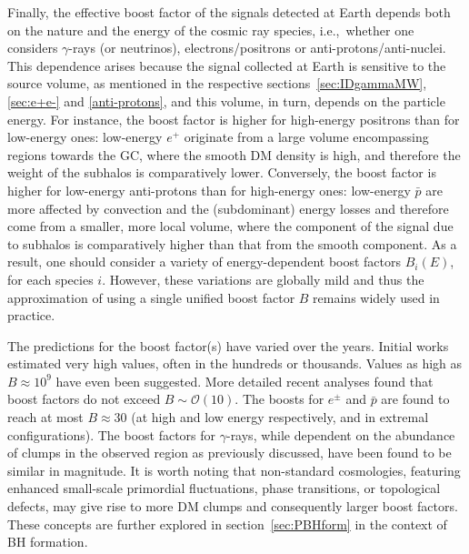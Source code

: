 \smallskip

Finally, the effective boost factor of the signals detected at Earth depends both on the nature and the energy of the cosmic ray species, i.e.,~whether one considers $\gamma$-rays (or neutrinos), electrons/positrons or anti-protons/anti-nuclei. This dependence arises because the signal collected at Earth  is sensitive to the source volume, as mentioned in the respective sections~\ref{sec:IDgammaMW}, \ref{sec:e+e-} and \ref{anti-protons}, and this volume, in turn,  depends on the particle energy. For instance, the boost factor is higher for high-energy positrons than for low-energy ones: low-energy $e^+$ originate from a large volume encompassing regions towards the GC, where the smooth DM density is high, 
and therefore the weight of the subhalos is comparatively lower. 
Conversely,  the boost factor is higher for low-energy anti-protons than for high-energy ones: low-energy $\bar p$ are more affected by convection and the (subdominant) energy losses and therefore come from a smaller, more local volume, where the component of the signal due to subhalos is comparatively higher than that from the smooth component. 
As a result, one should consider a variety
of energy-dependent boost factors $B_i(E)$, for each species $i$. However, these variations are globally mild and thus the approximation of using a single unified boost factor $B$ remains widely used in practice. 

\medskip

The predictions 
for the boost factor(s) 
have varied over the years.
Initial works estimated very high values, often in the hundreds or thousands. 
Values as high as $B \approx 10^9$ have even been suggested. 
More detailed recent analyses found that boost factors do not exceed $B \sim \mathcal{O}(10)$. 
The boosts for $e^\pm$ and $\bar p$ are found to reach at most $B \approx 30$ (at high and low energy respectively, and in extremal configurations). 
The boost factors for $\gamma$-rays, while dependent on the abundance of clumps in the observed region as previously discussed, have been found to be similar in magnitude.
It is worth noting that non-standard cosmologies, featuring enhanced small-scale primordial fluctuations, phase transitions, or topological defects, may give rise to more DM clumps and consequently larger boost factors. These concepts are further explored in section~\ref{sec:PBHform} in the context of BH formation.





